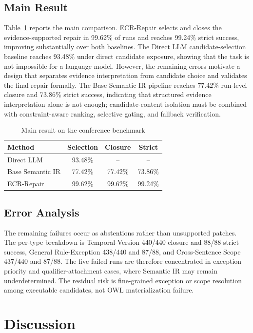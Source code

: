 \documentclass[conference]{IEEEtran}
\begin{document}
\subsection{Main Result}

Table~\ref{tab:main_result} reports the main comparison. ECR-Repair selects and closes the evidence-supported repair in 99.62\% of runs and reaches 99.24\% strict success, improving substantially over both baselines. The Direct LLM candidate-selection baseline reaches 93.48\% under direct candidate exposure, showing that the task is not impossible for a language model. However, the remaining errors motivate a design that separates evidence interpretation from candidate choice and validates the final repair formally. The Base Semantic IR pipeline reaches 77.42\% run-level closure and 73.86\% strict success, indicating that structured evidence interpretation alone is not enough; candidate-content isolation must be combined with constraint-aware ranking, selective gating, and fallback verification.

\begin{table}[t]
\centering
\caption{Main result on the conference benchmark}
\label{tab:main_result}
\begin{tabular}{lccc}
\toprule
Method & Selection & Closure & Strict \\
\midrule
Direct LLM & 93.48\% & -- & -- \\
Base Semantic IR & 77.42\% & 77.42\% & 73.86\% \\
ECR-Repair & 99.62\% & 99.62\% & 99.24\% \\
\bottomrule
\end{tabular}
\end{table}

\subsection{Error Analysis}

The remaining failures occur as abstentions rather than unsupported patches. The per-type breakdown is Temporal-Version 440/440 closure and 88/88 strict success, General Rule-Exception 438/440 and 87/88, and Cross-Sentence Scope 437/440 and 87/88. The five failed runs are therefore concentrated in exception priority and qualifier-attachment cases, where Semantic IR may remain underdetermined. The residual risk is fine-grained exception or scope resolution among executable candidates, not OWL materialization failure.

\section{Discussion}
\end{document}
